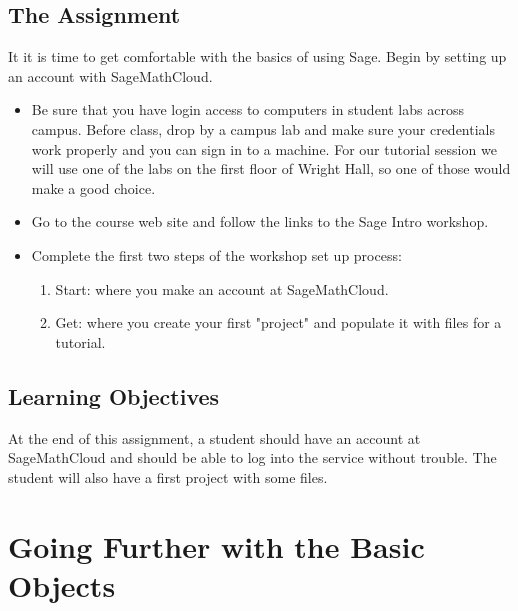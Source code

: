 \documentclass[10pt,]{book}
\theoremstyle{plain}
\numberwithin{equation}{section}
\begin{document}
\subsection[The Assignment]{The Assignment}\label{subsection-15}
It it is time to get comfortable with the basics of using Sage. Begin by
      setting up an account with SageMathCloud.%
\begin{itemize}
\item{}Be sure that you have login access to computers in student labs across
          campus. Before class, drop by a campus lab and make sure your credentials
          work properly and you can sign in to a machine. For our tutorial session
          we will use one of the labs on the first floor of Wright Hall, so one
          of those would make a good choice.%

        \item{}Go to the course web site and follow the links to the Sage Intro
          workshop.%

        \item{}Complete the first two steps of the workshop set up process:
          \begin{enumerate}
\item{}Start: where you make an account at SageMathCloud.\item{}Get: where you create your first "project" and populate it with
              files for a tutorial.\end{enumerate}
%

        \end{itemize}
\typeout{************************************************}
\typeout{************************************************}
\subsection[Learning Objectives]{Learning Objectives}\label{subsection-16}
At the end of this assignment, a student should have an account at
        SageMathCloud and should be able to log into the service without trouble.
        The student will also have a first project with some files.%
\clearpage
\typeout{************************************************}
\typeout{************************************************}
\section[Going Further with the Basic Objects]{Going Further with the Basic Objects}\label{basic-objects-going-further}
\typeout{************************************************}
\typeout{************************************************}
\end{document}
